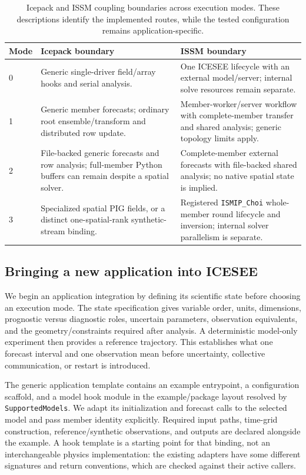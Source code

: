 \documentclass[11pt,a4paper]{article}
\newcommand{\code}[1]{\nolinkurl{#1}}
\begin{document}
\begin{table}[htbp]\centering\small
\caption{Icepack and ISSM coupling boundaries across execution modes. These descriptions identify the implemented routes, while the tested configuration remains application-specific.}\label{tab:couplingmodes}
\begin{tabular}{p{.07\linewidth}p{.42\linewidth}p{.42\linewidth}}\toprule
Mode & Icepack boundary & ISSM boundary\\\midrule
0 & Generic single-driver field/array hooks and serial analysis. & One ICESEE lifecycle with an external model/server; internal solve resources remain separate.\\
1 & Generic member forecasts; ordinary root ensemble/transform and distributed row update. & Member-worker/server workflow with complete-member transfer and shared analysis; generic topology limits apply.\\
2 & File-backed generic forecasts and row analysis; full-member Python buffers can remain despite a spatial solver. & Complete-member external forecasts with file-backed shared analysis; no native spatial state is implied.\\
3 & Specialized spatial PIG fields, or a distinct one-spatial-rank synthetic-stream binding. & Registered \code{ISMIP_Choi} whole-member round lifecycle and inversion; internal solver parallelism is separate.\\\bottomrule
\end{tabular}
\end{table}

\subsection{Bringing a new application into ICESEE}
We begin an application integration by defining its scientific state before choosing an execution mode. The state specification gives variable order, units, dimensions, prognostic versus diagnostic roles, uncertain parameters, observation equivalents, and the geometry/constraints required after analysis. A deterministic model-only experiment then provides a reference trajectory. This establishes what one forecast interval and one observation mean before uncertainty, collective communication, or restart is introduced.

The generic application template contains an example entrypoint, a configuration scaffold, and a model hook module in the example/package layout resolved by \code{SupportedModels}. We adapt its initialization and forecast calls to the selected model and pass member identity explicitly. Required input paths, time-grid construction, reference/synthetic observations, and outputs are declared alongside the example. A hook template is a starting point for that binding, not an interchangeable physics implementation: the existing adapters have some different signatures and return conventions, which are checked against their active callers.
\end{document}
